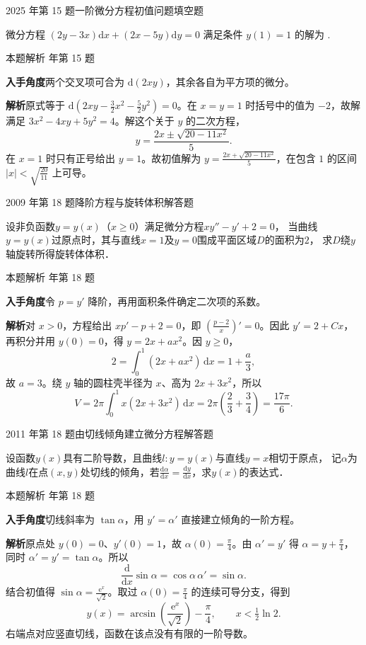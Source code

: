 \documentclass[UTF8,zihao=-4,fontset=fandol]{ctexart}
\newcommand{\blank}{\underline{\hspace{5em}}}
\newcommand{\QuestionPage}[6]{%
  \par\noindent\begin{minipage}{\linewidth}
  \raggedright
  {\small\textcolor{black!60}{#3\quad #5}\hfill\textcolor{accent}{#2}}\par\smallskip}
\newcommand{\QuestionEnd}{\end{minipage}\par\medskip}
\newcommand{\QuestionPage}[6]{%
  \clearpage
  {\small\textcolor{accent}{#1\hfill #2}}\par\medskip
  {\small\textcolor{black!60}{#3\quad #5\hfill #6}}\par\vspace{9bp}}
\newcommand{\QuestionEnd}{}
\newenvironment{QuestionSolution}[1]{%
  \clearpage
  {\small\textcolor{black!60}{本题解析\quad #1}}\par\medskip
}{\par\clearpage}
\begin{document}
\QuestionPage{4.1 几类简单的微分方程}{填空题}{2025 年第 15 题}{2}{一阶微分方程初值问题}{207 / 234}
微分方程 \(\left( 2y - 3x \right) \mathrm{d} x + \left( 2x - 5y \right) \mathrm{d} y = 0\) 满足条件 \(y\left( 1 \right) = 1\) 的解为 \blank{}.
\QuestionEnd

\begin{QuestionSolution}{2025 年第 15 题}
\textbf{入手角度}\quad 两个交叉项可合为 \(\mathrm{d}(2xy)\)，其余各自为平方项的微分。

\textbf{解析}\quad 原式等于 \(\mathrm{d}(2xy-\tfrac32x^2-\tfrac52y^2)=0\)。在 \(x=y=1\) 时括号中的值为 \(-2\)，故解满足 \(3x^2-4xy+5y^2=4\)。解这个关于 \(y\) 的二次方程，
\[
y=\frac{2x\pm\sqrt{20-11x^2}}5 .
\]
在 \(x=1\) 时只有正号给出 \(y=1\)。故初值解为 \(\boxed{y=\frac{2x+\sqrt{20-11x^2}}{5}}\)，在包含 \(1\) 的区间 \(|x|<\sqrt{\frac{20}{11}}\) 上可导。
\end{QuestionSolution}

\QuestionPage{4.1 几类简单的微分方程}{解答题}{2009 年第 18 题}{3}{降阶方程与旋转体积}{208 / 234}
设非负函数$y = y(x)$（$x \ge 0$）满足微分方程$xy'' - y' + 2 = 0$，
当曲线$y = y(x)$过原点时，其与直线$x = 1$及$y = 0$围成平面区域$D$的面积为$2$，
求$D$绕$y$轴旋转所得旋转体体积．
\QuestionEnd

\begin{QuestionSolution}{2009 年第 18 题}
\textbf{入手角度}\quad 令 \(p=y'\) 降阶，再用面积条件确定二次项的系数。

\textbf{解析}\quad 对 \(x>0\)，方程给出 \(xp'-p+2=0\)，即 \((\frac{p-2}{x})'=0\)。因此 \(y'=2+Cx\)，再积分并用 \(y(0)=0\)，得 \(y=2x+ax^2\)。因 \(y\ge0\)，
\[
2=\int_0^1(2x+ax^2)\,\mathrm{d}x=1+\frac a3,
\]
故 \(a=3\)。绕 \(y\) 轴的圆柱壳半径为 \(x\)、高为 \(2x+3x^2\)，所以
\[
V=2\pi\int_0^1 x(2x+3x^2)\,\mathrm{d}x
=2\pi\left(\frac23+\frac34\right)=\boxed{\frac{17\pi}{6}}.
\]
\end{QuestionSolution}

\QuestionPage{4.1 几类简单的微分方程}{解答题}{2011 年第 18 题}{3}{由切线倾角建立微分方程}{209 / 234}
设函数$y(x)$具有二阶导数，且曲线$l:y = y(x)$与直线$y = x$相切于原点，
记$\alpha$为曲线$l$在点$(x,y)$处切线的倾角，若$\frac{\mathrm{d}\alpha}{\mathrm{d} x} = \frac{\mathrm{d} y}{\mathrm{d} x}$，求$y(x)$的表达式．
\QuestionEnd

\begin{QuestionSolution}{2011 年第 18 题}
\textbf{入手角度}\quad 切线斜率为 \(\tan\alpha\)，用 \(y'=\alpha'\) 直接建立倾角的一阶方程。

\textbf{解析}\quad 原点处 \(y(0)=0\)、\(y'(0)=1\)，故 \(\alpha(0)=\frac{\pi}{4}\)。由 \(\alpha'=y'\) 得 \(\alpha=y+\frac{\pi}{4}\)，同时 \(\alpha'=y'=\tan\alpha\)。所以
\[
\frac{\mathrm{d}}{\mathrm{d}x}\sin\alpha
=\cos\alpha\,\alpha'=\sin\alpha.
\]
结合初值得 \(\sin\alpha=\frac{\mathrm{e}^x}{\sqrt2}\)。取过 \(\alpha(0)=\frac{\pi}{4}\) 的连续可导分支，得到
\[
\boxed{y(x)=\arcsin(\frac{\mathrm{e}^x}{\sqrt2})-\frac{\pi}{4}},\qquad x<\tfrac12\ln2 .
\]
右端点对应竖直切线，函数在该点没有有限的一阶导数。
\end{QuestionSolution}
\end{document}
